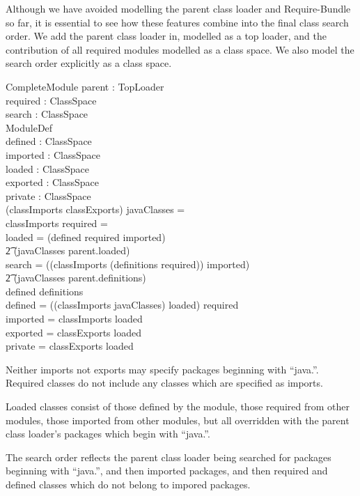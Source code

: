 \documentclass[a4paper,9pt]{article}
\begin{document}
Although we have avoided modelling the parent class loader and Require-Bundle
so far, it is essential to see how these features combine into the final
class search order.
We add the parent class loader in, modelled as a top loader, and the
contribution of all required modules modelled as a class space.
We also model the search order explicitly as a class space.
\begin{schema}{CompleteModule}
  parent : TopLoader \\
  required : ClassSpace \\
  search : ClassSpace \\
  ModuleDef \\
  defined : ClassSpace \\
  imported : ClassSpace \\
  loaded : ClassSpace \\
  exported : ClassSpace \\
  private : ClassSpace \\
\where
  (classImports \cup classExports) \cap javaClasses = \emptyset \\
  classImports \cap \dom required = \emptyset \\
  loaded = (defined \cup required \cup imported) \\
\t2 \oplus (javaClasses \dres parent.loaded) \\
  search = ((classImports \ndres (definitions \oplus required)) \cup imported) \\
\t2 \oplus (javaClasses \dres parent.definitions) \\
  defined \subseteq definitions \\
  defined = ((classImports \cup javaClasses) \ndres loaded) \setminus required \\
  imported = classImports \dres loaded \\
  exported = classExports \dres loaded \\
  private = classExports \ndres loaded \\
\end{schema}
Neither imports not exports may specify packages beginning with ``java.''.
Required classes do not include any classes which are specified as imports.

Loaded classes consist of those defined by the module, those required from other modules,
those imported from other modules, but all overridden with the parent class loader's packages
which begin with ``java.''.

The search order reflects the parent class loader being searched for packages beginning with
``java.'', and then imported packages, and then required and defined classes which do not
belong to impored packages.
\end{document}
